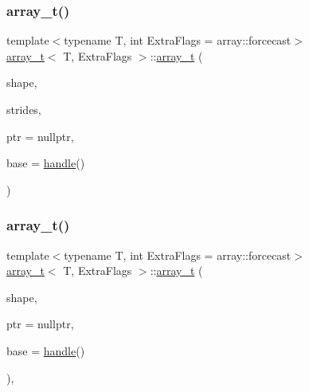 \subsubsection{\texorpdfstring{array\_t()}{array\_t()}\hspace{0.1cm}{\footnotesize\ttfamily [7/9]}}
{\footnotesize\ttfamily template$<$typename T, int Extra\+Flags = array\+::forcecast$>$ \\
\mbox{\hyperlink{classarray__t}{array\+\_\+t}}$<$ T, Extra\+Flags $>$\+::\mbox{\hyperlink{classarray__t}{array\+\_\+t}} (\begin{DoxyParamCaption}\item[{\mbox{\hyperlink{classarray_a3378d7821106645fa3a88c5222e127e0}{Shape\+Container}}}]{shape,  }\item[{\mbox{\hyperlink{classarray_a8ba4f30946f0bc69ec937160c9fb10e1}{Strides\+Container}}}]{strides,  }\item[{const T $\ast$}]{ptr = {\ttfamily nullptr},  }\item[{\mbox{\hyperlink{classhandle}{handle}}}]{base = {\ttfamily \mbox{\hyperlink{classhandle}{handle}}()} }\end{DoxyParamCaption})\hspace{0.3cm}{\ttfamily [inline]}}

\mbox{\label{classarray__t_a93a19b75568c0df2c021f6ca74f5c59f}} 
\subsubsection{\texorpdfstring{array\_t()}{array\_t()}\hspace{0.1cm}{\footnotesize\ttfamily [8/9]}}
{\footnotesize\ttfamily template$<$typename T, int Extra\+Flags = array\+::forcecast$>$ \\
\mbox{\hyperlink{classarray__t}{array\+\_\+t}}$<$ T, Extra\+Flags $>$\+::\mbox{\hyperlink{classarray__t}{array\+\_\+t}} (\begin{DoxyParamCaption}\item[{\mbox{\hyperlink{classarray_a3378d7821106645fa3a88c5222e127e0}{Shape\+Container}}}]{shape,  }\item[{const T $\ast$}]{ptr = {\ttfamily nullptr},  }\item[{\mbox{\hyperlink{classhandle}{handle}}}]{base = {\ttfamily \mbox{\hyperlink{classhandle}{handle}}()} }\end{DoxyParamCaption})\hspace{0.3cm}{\ttfamily [inline]}, {\ttfamily [explicit]}}

